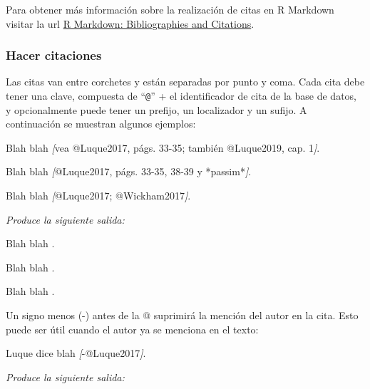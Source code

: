 \documentclass[12pt,a4paper,oneside,]{article}
\newenvironment{Shaded}{\begin{snugshade}}{\end{snugshade}}
\newcommand{\CommentTok}[1]{\textcolor[rgb]{0.56,0.35,0.01}{\textit{#1}}}
\newcommand{\NormalTok}[1]{#1}
\newcommand{\OtherTok}[1]{\textcolor[rgb]{0.56,0.35,0.01}{#1}}
\numberwithin{dummy}{section}
\theoremstyle{ocrenumbox}
\theoremstyle{blacknumex}
\theoremstyle{blacknumbox}
\theoremstyle{ocrenum}
\theoremstyle{ocrenum}
\begin{document}
\normalsize

Para obtener más información sobre la realización de citas en R Markdown
visitar la url
\href{https://rmarkdown.rstudio.com/authoring_bibliographies_and_citations.html}{R
Markdown: Bibliographies and Citations}.

\hypertarget{hacer-citaciones}{%
\subsubsection{Hacer citaciones}\label{hacer-citaciones}}

Las citas van entre corchetes y están separadas por punto y coma. Cada
cita debe tener una clave, compuesta de ``\texttt{@}'' + el
identificador de cita de la base de datos, y opcionalmente puede tener
un prefijo, un localizador y un sufijo. A continuación se muestran
algunos ejemplos:

\begin{Shaded}
\begin{Highlighting}[]
\NormalTok{Blah blah }\CommentTok{[}\OtherTok{vea @Luque2017, págs. 33{-}35; también @Luque2019, cap. 1}\CommentTok{]}\NormalTok{.}

\NormalTok{Blah blah }\CommentTok{[}\OtherTok{@Luque2017, págs. 33{-}35, 38{-}39 y *passim*}\CommentTok{]}\NormalTok{.}

\NormalTok{Blah blah }\CommentTok{[}\OtherTok{@Luque2017; @Wickham2017}\CommentTok{]}\NormalTok{.}
\end{Highlighting}
\end{Shaded}

\emph{Produce la siguiente salida:}

Blah blah \citetext{\citealp[vea][págs.
33-35]{Luque2017}; \citealp[también][cap. 1]{Luque2019}}.

Blah blah \citep[págs. 33-35, 38-39 y \emph{passim}]{Luque2017}.

Blah blah \citep{Luque2017, Wickham2017}.

Un signo menos (-) antes de la @ suprimirá la mención del autor en la
cita. Esto puede ser útil cuando el autor ya se menciona en el texto:

\begin{Shaded}
\begin{Highlighting}[]
\NormalTok{Luque dice blah }\CommentTok{[}\OtherTok{{-}@Luque2017}\CommentTok{]}\NormalTok{.}
\end{Highlighting}
\end{Shaded}

\emph{Produce la siguiente salida:}
\end{document}
